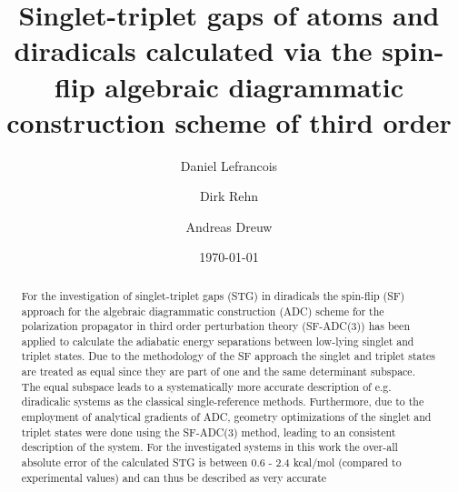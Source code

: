 \documentclass[aip,graphicx,amsmath,reprint]{revtex4-1}
\begin{document}

\title{Singlet-triplet gaps of atoms and diradicals calculated via the spin-flip algebraic diagrammatic construction scheme of third order } %



\author{Daniel Lefrancois}
\author{Dirk Rehn}
\author{Andreas Dreuw}


\date{\today}

\begin{abstract}
For the investigation of singlet-triplet gaps (STG) in diradicals the spin-flip (SF) approach for the algebraic diagrammatic construction (ADC) scheme for the polarization propagator in third order perturbation theory (SF-ADC(3)) has been applied to calculate the adiabatic energy separations between low-lying singlet and triplet states. Due to the methodology of the SF approach the singlet and triplet states are treated as equal since they are part of one and the same determinant subspace. The equal subspace leads to a systematically more accurate description of e.g. diradicalic systems as the classical single-reference methods. Furthermore, due to the employment of analytical gradients of ADC, geometry optimizations of the singlet and triplet states were done using the SF-ADC(3) method, leading to an consistent description of the system. For the investigated systems in this work the over-all absolute error of the calculated STG is between 0.6 - 2.4 kcal/mol (compared to experimental values) and can thus be described as very accurate\end{abstract}
\end{document}
